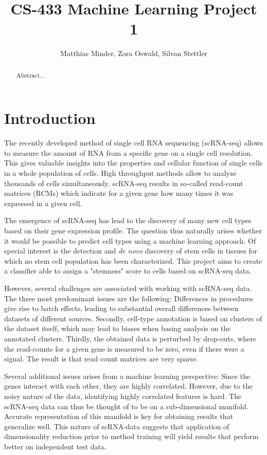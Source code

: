 \documentclass[10pt,conference,compsocconf]{IEEEtran}
\begin{document}
\title{CS-433 Machine Learning Project 1}

\author{
  Matthias Minder, Zora Oswald, Silvan Stettler\\
}

\maketitle

\begin{abstract}
Abstract...
\end{abstract}

\section*{Introduction} 
The recently developed method of single cell RNA sequencing (scRNA-seq) allows to measure the amount of RNA from a specific gene on a single cell resolution. This gives valuable insights into the properties and cellular function of single cells in a whole population of cells. High throughput methods allow to analyze thousands of cells simultaneously. scRNA-seq results in so-called read-count matrices (RCMs) which indicate for a given gene how many times it was expressed in a given cell.
\par 
The emergence of scRNA-seq has lead to the discovery of many new cell types based on their gene expression profile. The question thus naturally arises whether it would be possible to predict cell types using a machine learning approach. Of special interest is the detection and \textit{de novo} discovery of stem cells in tissues for which no stem cell population has been characterized. This project aims to create a classifier able to assign a "stemness" score to cells based on scRNA-seq data. 
\par
However, several challenges are associated with working with scRNA-seq data. The three most predominant issues are the following: Differences in procedures give rise to batch effects, leading to substantial overall differences between datasets of different sources. Secondly, cell-type annotation is based on clusters of the dataset itself, which may lead to biases when basing analysis on the annotated clusters. Thirdly, the obtained data is perturbed by drop-outs, where the read-counts for a given gene is measured to be zero, even if there were a signal. The result is that read count matrices are very sparse. 
\par
Several additional issues arises from a machine learning perspective: Since the genes interact with each other, they are highly correlated. However, due to the noisy nature of the data, identifying highly correlated features is hard. The scRNA-seq data can thus be thought of to be on a sub-dimensional manifold. Accurate representation of this manifold is key for obtaining results that generalize well. This nature of scRNA-data suggests that application of dimensionality reduction prior to method training will yield results that perform better on independent test data.
\end{document}
